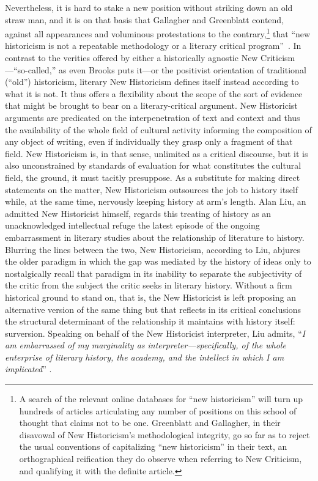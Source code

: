 Nevertheless, it is hard to stake a new position without striking down an old straw man, and it is on that basis that Gallagher and Greenblatt contend, against all appearances and voluminous protestations to the contrary,\footnote{A search of the relevant online databases for ``new historicism'' will turn up hundreds of articles articulating any number of positions on this school of thought that claims not to be one. Greenblatt and Gallagher, in their disavowal of New Historicism's methodological integrity, go so far as to reject the usual conventions of capitalizing ``new historicism'' in their text, an orthographical reification they do observe when referring to New Criticism, and qualifying it with the definite article.} that ``new historicism is not a repeatable methodology or a literary critical program''~\cite[19]{Greenblatt/Gallagher}. In contrast to the verities offered by either a historically agnostic New Criticism---``so-called,'' as even Brooks puts it---or the positivist orientation of traditional (``old'') historicism, literary New Historicism defines itself instead according to what it is not. It thus offers a flexibility about the scope of the sort of evidence that might be brought to bear on a literary-critical argument. New Historicist arguments are predicated on the interpenetration of text and context and thus the availability of the whole field of cultural activity informing the composition of any object of writing, even if individually they grasp only a fragment of that field. New Historicism is, in that sense, unlimited as a critical discourse, but it is also unconstrained by standards of evaluation for what constitutes the cultural field, the ground, it must tacitly presuppose. As a substitute for making direct statements on the matter, New Historicism outsources the job to history itself while, at the same time, nervously keeping history at arm's length. Alan Liu, an admitted New Historicist himself, regards this treating of history as an unacknowledged intellectual refuge the latest episode of the ongoing embarrassment in literary studies about the relationship of literature to history. Blurring the lines between the two, New Historicism, according to Liu, abjures the older paradigm in which the gap was mediated by the history of ideas only to nostalgically recall that paradigm in its inability to separate the subjectivity of the critic from the subject the critic seeks in literary history. Without a firm historical ground to stand on, that is, the New Historicist is left proposing an alternative version of the same thing but that reflects in its critical conclusions the structural determinant of the relationship it maintains with history itself: surversion. Speaking on behalf of the New Historicist interpreter, Liu admits, ``\emph{I am embarrassed of my marginality as interpreter---specifically, of the whole enterprise of literary history, the academy, and the intellect in which I am implicated}'' \cite[747]{AlanLiu}.

